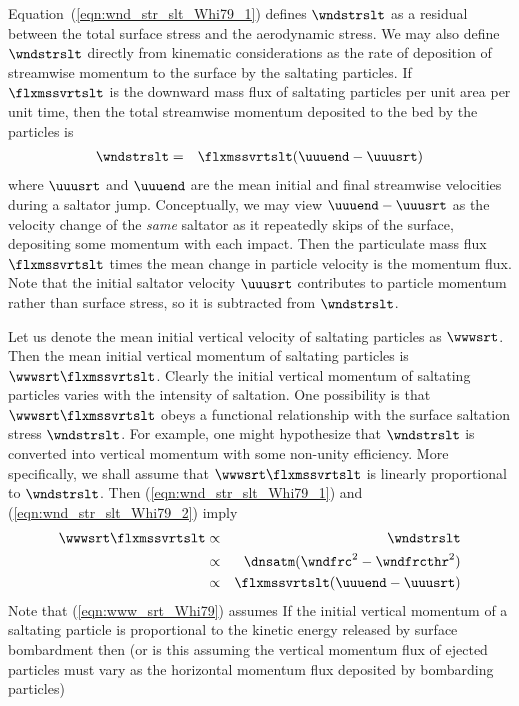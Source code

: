 \documentclass[12pt,twoside]{book}
\begin{document}
Equation~(\ref{eqn:wnd_str_slt_Whi79_1}) defines $\wndstrslt$ as a
residual between the total surface stress and the aerodynamic stress. 
We may also define $\wndstrslt$ directly from kinematic considerations
as the rate of deposition of streamwise momentum to the surface by the
saltating particles. 
If $\flxmssvrtslt$ is the downward mass flux of saltating particles
per unit area per unit time, then the total streamwise momentum
deposited to the bed by the particles is 
\begin{eqnarray}
\wndstrslt & = & \flxmssvrtslt (\uuuend - \uuusrt)
\label{eqn:wnd_str_slt_Whi79_2}
\end{eqnarray}
where $\uuusrt$ and $\uuuend$ are the mean initial and final
streamwise velocities during a saltator jump.
Conceptually, we may view $\uuuend - \uuusrt$ as the velocity change
of the \textit{same} saltator as it repeatedly skips of the surface,
depositing some momentum with each impact.
Then the particulate mass flux $\flxmssvrtslt$ times the mean change
in particle velocity is the momentum flux.
Note that the initial saltator velocity $\uuusrt$ contributes to
particle momentum rather than surface stress, so it is subtracted from 
$\wndstrslt$.

Let us denote the mean initial vertical velocity of saltating
particles as $\wwwsrt$.
Then the mean initial vertical momentum of saltating particles is
$\wwwsrt \flxmssvrtslt$.
Clearly the initial vertical momentum of saltating particles varies
with the intensity of saltation.
One possibility is that $\wwwsrt \flxmssvrtslt$ obeys a functional
relationship with the surface saltation stress $\wndstrslt$.
For example, one might hypothesize that $\wndstrslt$ is converted into
vertical momentum with some non-unity efficiency.
More specifically, we shall assume that $\wwwsrt \flxmssvrtslt$ is
linearly proportional to $\wndstrslt$.
Then (\ref{eqn:wnd_str_slt_Whi79_1}) and
(\ref{eqn:wnd_str_slt_Whi79_2}) imply  
\begin{eqnarray}
\wwwsrt \flxmssvrtslt & \propto & \wndstrslt \nonumber \\
& \propto & \dnsatm ( \wndfrc^{2} - \wndfrcthr^{2} ) \nonumber \\
& \propto & \flxmssvrtslt (\uuuend - \uuusrt)
\label{eqn:www_srt_Whi79}
\end{eqnarray}
Note that (\ref{eqn:www_srt_Whi79}) assumes
If the initial vertical momentum of a saltating particle is
proportional to the kinetic energy released by surface bombardment 
then (or is this assuming the vertical momentum flux of ejected
particles must vary as the horizontal momentum flux deposited by
bombarding particles) 
\end{document}
